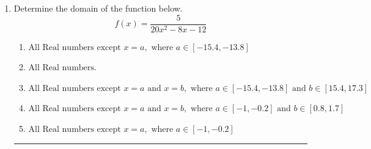 \documentclass[14pt]{extbook}
\newcommand{\litem}[1]{\item#1\hspace*{-1cm}\rule{\textwidth}{0.4pt}}
\begin{document}
\begin{enumerate}
{\begin{enumerate}[label=\Alph*.]
\end{enumerate} }
\litem{
Determine the domain of the function below.\[ f(x) = \frac{5}{20x^{2} -8 x -12} \]\begin{enumerate}[label=\Alph*.]
\item \( \text{All Real numbers except } x = a, \text{ where } a \in [-15.4, -13.8] \)
\item \( \text{All Real numbers.} \)
\item \( \text{All Real numbers except } x = a \text{ and } x = b, \text{ where } a \in [-15.4, -13.8] \text{ and } b \in [15.4, 17.3] \)
\item \( \text{All Real numbers except } x = a \text{ and } x = b, \text{ where } a \in [-1, -0.2] \text{ and } b \in [0.8, 1.7] \)
\item \( \text{All Real numbers except } x = a, \text{ where } a \in [-1, -0.2] \)


\end{enumerate}}
\end{enumerate}
\end{document}
